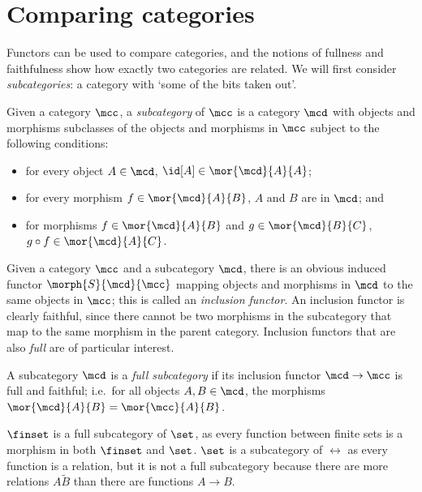 \section{Comparing categories}

Functors can be used to compare categories, and the notions of fullness and
faithfulness show how exactly two categories are related.
We will first consider \emph{subcategories}: a category with `some of the bits
taken out'.

\begin{definition}[Subcategory]
    Given a category \(\mcc\), a \emph{subcategory} of \(\mcc\) is a category
    \(\mcd\) with objects and morphisms subclasses of the objects and morphisms
    in \(\mcc\) subject to the following conditions:
    \begin{itemize}
        \item for every object \(A \in \mcd\), \(\id[A] \in \mor{\mcd}{A}{A}\);
        \item for every morphism \(f \in \mor{\mcd}{A}{B}\), \(A\) and \(B\) are
                in \(\mcd\); and
        \item for morphisms \(f \in \mor{\mcd}{A}{B}\) and
                \(g \in \mor{\mcd}{B}{C}\), \(g \circ f \in \mor{\mcd}{A}{C}\).
    \end{itemize}
\end{definition}

Given a category \(\mcc\) and a subcategory \(\mcd\), there is an obvious
induced functor \(\morph{S}{\mcd}{\mcc}\) mapping objects and morphisms
in \(\mcd\) to the same objects in \(\mcc\); this is called an
\emph{inclusion functor}.
An inclusion functor is clearly faithful, since there cannot be two morphisms in
the subcategory that map to the same morphism in the parent category.
Inclusion functors that are also \emph{full} are of particular interest.

\begin{definition}
    A subcategory \(\mcd\) is a \emph{full subcategory} if its inclusion functor
    \(\mcd \to \mcc\) is full and faithful; i.e.\ for all objects
    \(A, B \in \mcd\), the morphisms \(\mor{\mcd}{A}{B} = \mor{\mcc}{A}{B}\).
\end{definition}

\begin{example}
    \(\finset\) is a full subcategory of \(\set\), as every function between
    finite sets is a morphism in both \(\finset\) and \(\set\).
    \(\set\) is a subcategory of \(\rel\) as every function is a relation, but
    it is not a full subcategory because there are more relations \(A \tilde B\)
    than there are functions \(A \to B\).
\end{example}

